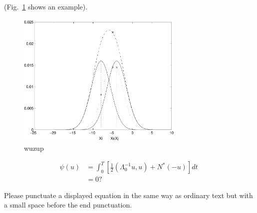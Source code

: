 \documentclass[runningheads]{llncs}
\begin{document}
(Fig.~\ref{fig:example} shows an example).
\begin{figure}
\centering
\includegraphics[height=6.5cm]{figures/eijkel2}
\caption{wuzup}
\label{fig:example}
\end{figure}


\begin{align}
  \psi (u) & = \int_{0}^{T} \left[\frac{1}{2}
  \left(\Lambda_{0}^{-1} u,u\right) + N^{\ast} (-u)\right] dt \; \\
& = 0 ?
\end{align}

Please punctuate a displayed equation in the same way as ordinary
text but with a small space before the end punctuation.
\end{document}
